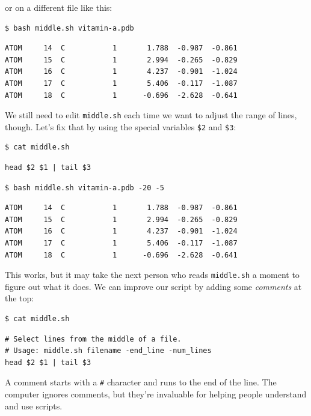 \documentclass[]{book}
\newcommand{\gdef}[2]{\emph{#2}}
\begin{document}
or on a different file like this:

\begin{verbatim}
$ bash middle.sh vitamin-a.pdb
\end{verbatim}

\begin{verbatim}
ATOM     14  C           1       1.788  -0.987  -0.861
ATOM     15  C           1       2.994  -0.265  -0.829
ATOM     16  C           1       4.237  -0.901  -1.024
ATOM     17  C           1       5.406  -0.117  -1.087
ATOM     18  C           1      -0.696  -2.628  -0.641
\end{verbatim}

We still need to edit \texttt{middle.sh} each time we want to adjust the
range of lines, though. Let's fix that by using the special variables
\texttt{\$2} and \texttt{\$3}:

\begin{verbatim}
$ cat middle.sh
\end{verbatim}

\begin{verbatim}
head $2 $1 | tail $3
\end{verbatim}

\begin{verbatim}
$ bash middle.sh vitamin-a.pdb -20 -5
\end{verbatim}

\begin{verbatim}
ATOM     14  C           1       1.788  -0.987  -0.861
ATOM     15  C           1       2.994  -0.265  -0.829
ATOM     16  C           1       4.237  -0.901  -1.024
ATOM     17  C           1       5.406  -0.117  -1.087
ATOM     18  C           1      -0.696  -2.628  -0.641
\end{verbatim}

This works, but it may take the next person who reads \texttt{middle.sh}
a moment to figure out what it does. We can improve our script by adding
some \gdef{g:comment}{comments} at the top:

\begin{verbatim}
$ cat middle.sh
\end{verbatim}

\begin{verbatim}
# Select lines from the middle of a file.
# Usage: middle.sh filename -end_line -num_lines
head $2 $1 | tail $3
\end{verbatim}

A comment starts with a \texttt{\#} character and runs to the end of the
line. The computer ignores comments, but they're invaluable for helping
people understand and use scripts.
\end{document}
